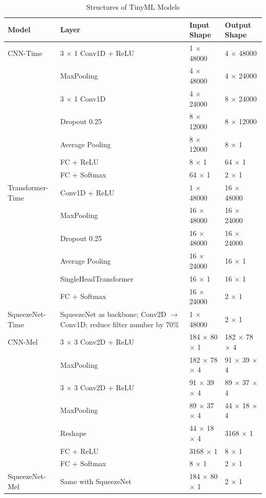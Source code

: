 \begin{table}[ht]
\centering
\caption{Structures of TinyML Models}
\begin{tabular}{|l|l|l|l|}
\hline
\textbf{Model} & \textbf{Layer} & \textbf{Input Shape} & \textbf{Output Shape} \\
\hline
CNN-Time & 
3 $\times$ 1 Conv1D + ReLU & 1 $\times$ 48000 & 4 $\times$ 48000 \\
& MaxPooling & 4 $\times$ 48000 & 4 $\times$ 24000 \\
& 3 $\times$ 1 Conv1D & 4 $\times$ 24000 & 8 $\times$ 24000 \\
& Dropout 0.25 & 8 $\times$ 12000 & 8 $\times$ 12000 \\
& Average Pooling & 8 $\times$ 12000 & 8 $\times$ 1 \\
& FC + ReLU & 8 $\times$ 1 & 64 $\times$ 1 \\
& FC + Softmax & 64 $\times$ 1 & 2 $\times$ 1 \\
\hline
Transformer-Time & 
Conv1D + ReLU & 1 $\times$ 48000 & 16 $\times$ 48000 \\
& MaxPooling & 16 $\times$ 48000 & 16 $\times$ 24000 \\
& Dropout 0.25 & 16 $\times$ 48000 & 16 $\times$ 24000 \\
& Average Pooling & 16 $\times$ 24000 & 16 $\times$ 1 \\
& SingleHeadTransformer & 16 $\times$ 1 & 16 $\times$ 1 \\
& FC + Softmax & 16 $\times$ 24000 & 2 $\times$ 1 \\
\hline
SqueezeNet-Time & 
SqueezeNet as backbone; Conv2D $\rightarrow$ Conv1D; reduce filter number by 70\% & 
1 $\times$ 48000 & 2 $\times$ 1 \\
\hline
CNN-Mel & 
3 $\times$ 3 Conv2D + ReLU & 184 $\times$ 80 $\times$ 1 & 182 $\times$ 78 $\times$ 4 \\
& MaxPooling & 182 $\times$ 78 $\times$ 4 & 91 $\times$ 39 $\times$ 4 \\
& 3 $\times$ 3 Conv2D + ReLU & 91 $\times$ 39 $\times$ 4 & 89 $\times$ 37 $\times$ 4 \\
& MaxPooling & 89 $\times$ 37 $\times$ 4 & 44 $\times$ 18 $\times$ 4 \\
& Reshape & 44 $\times$ 18 $\times$ 4 & 3168 $\times$ 1 \\
& FC + ReLU & 3168 $\times$ 1 & 8 $\times$ 1 \\
& FC + Softmax & 8 $\times$ 1 & 2 $\times$ 1 \\
\hline
SqueezeNet-Mel & 
Same with SqueezeNet & 184 $\times$ 80 $\times$ 1 & 2 $\times$ 1 \\
\hline
\end{tabular}
\end{table}
